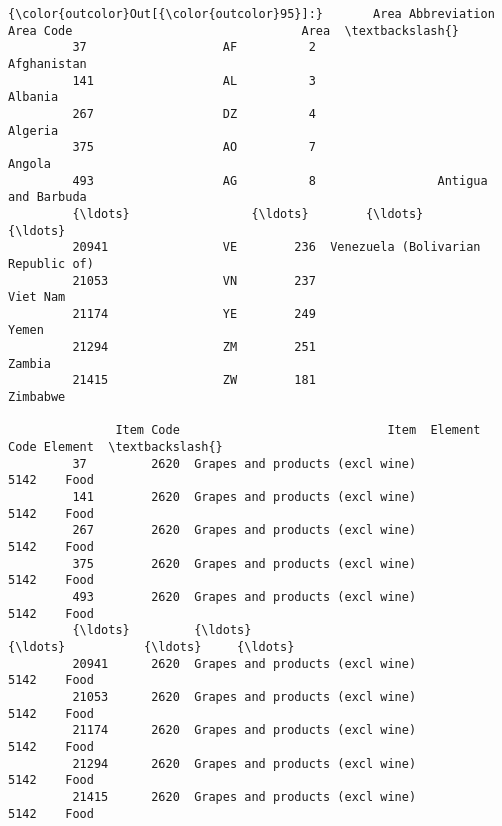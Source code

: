 \documentclass[11pt]{article}
\begin{document}
\begin{Verbatim}[commandchars=\\\{\}]
{\color{outcolor}Out[{\color{outcolor}95}]:}       Area Abbreviation  Area Code                                Area  \textbackslash{}
         37                   AF          2                         Afghanistan   
         141                  AL          3                             Albania   
         267                  DZ          4                             Algeria   
         375                  AO          7                              Angola   
         493                  AG          8                 Antigua and Barbuda   
         {\ldots}                 {\ldots}        {\ldots}                                 {\ldots}   
         20941                VE        236  Venezuela (Bolivarian Republic of)   
         21053                VN        237                            Viet Nam   
         21174                YE        249                               Yemen   
         21294                ZM        251                              Zambia   
         21415                ZW        181                            Zimbabwe   
         
               Item Code                             Item  Element Code Element  \textbackslash{}
         37         2620  Grapes and products (excl wine)          5142    Food   
         141        2620  Grapes and products (excl wine)          5142    Food   
         267        2620  Grapes and products (excl wine)          5142    Food   
         375        2620  Grapes and products (excl wine)          5142    Food   
         493        2620  Grapes and products (excl wine)          5142    Food   
         {\ldots}         {\ldots}                              {\ldots}           {\ldots}     {\ldots}   
         20941      2620  Grapes and products (excl wine)          5142    Food   
         21053      2620  Grapes and products (excl wine)          5142    Food   
         21174      2620  Grapes and products (excl wine)          5142    Food   
         21294      2620  Grapes and products (excl wine)          5142    Food   
         21415      2620  Grapes and products (excl wine)          5142    Food   
         

\end{Verbatim}
\end{document}
